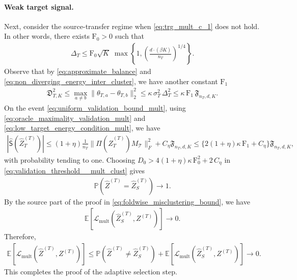 \documentclass[10pt]{article}
\newcommand{\wh}{\widehat}
\newcommand{\calT}{\mathcal T}
\newcommand{\trg}{T}
\newcommand{\nT}{n_{\trg}}
\newcommand{\sigmaT}{\sigma_{\trg}}
\newcommand{\Ztar}{Z^{(\trg)}}
\newcommand{\thetamcT}[1]{\theta_{\trg,#1}}
\newcommand{\DeltaT}{\Delta_{\trg}}
\newcommand{\hatZtar}{\wh{Z}^{(\trg)}}
\newcommand{\src}{S}
\begin{document}
\paragraph{Weak target signal.}
Next, consider the source-transfer regime when \eqref{eq:trg_mult_c_1} does not hold. In other words, there exists $\mathrm F_0>0$ such that
\begin{align}
    \label{eq:negation_of_forty}
   \DeltaT \le  \mathrm F_0\sqrt{K}\;\max\left\{1,
    \left(\frac{d \cdot (\beta K)}{\nT}\right)^{1/4} \right\}. 
\end{align}
Observe that by \eqref{eq:approximate_balance} and \eqref{eq:non_diverging_energy_inter_cluster}, we have another constant $\mathrm F_1$
\begin{align}
\label{eq:low_target_energy_condition_mult}
    \mathfrak D_{\trg,K}^2\le \max_{a \neq b}\|\thetamcT{a}-\thetamcT{b}\|^2_2 \le \kappa\,\sigmaT^2\, \DeltaT^2 \le \kappa\,\mathrm{F}_1\,\mathfrak F_{\nT,d,K}.
\end{align}
On the event \eqref{eq:uniform_validation_bound_mult}, using
\eqref{eq:oracle_maximality_validation_mult} and
\eqref{eq:low_target_energy_condition_mult}, we have
\begin{align}
    |\wh{\mathsf S}(\hatZtar_\trg)|
    \le (1+\eta)\frac{1}{\nT}\|\Pi(\hatZtar_\trg)M_\calT\|_F^2
    +C_\eta\mathfrak F_{\nT,d,K}
    \le \{2(1+\eta)\kappa\,\mathrm{F}_1+C_\eta\}\mathfrak F_{\nT,d,K},
\end{align}
with probability tending to one.
Choosing $D_0>4(1+\eta)\kappa\,\mathrm{F}^2_0+2\,C_\eta$ in
\eqref{eq:validation_threshold__mult_clust} gives
\begin{align}
\label{eq:adaptive_select_source_low_signal}
    \mathbb P\left(\hatZtar=\hatZtar_\src\right)\to1.
\end{align}
By the source part of the proof in \eqref{eq:foldwise_misclustering_bound}, we have
\begin{align}
\label{eq:source_estimator_consistency_mult}
    \mathbb E\left[\mathcal L_{\mathrm{mult}}(\hatZtar_\src,\Ztar)\right]\to0.
\end{align}
Therefore,
\begin{align}
    \mathbb E\left[\mathcal L_{\mathrm{mult}}(\hatZtar,\Ztar)\right]
    \le \mathbb P(\hatZtar\neq\hatZtar_\src)
    +\mathbb E\left[\mathcal L_{\mathrm{mult}}(\hatZtar_\src,\Ztar)\right]\to0.
\end{align}
This completes the proof of the adaptive selection step.
\end{document}
